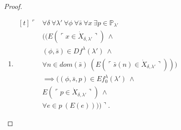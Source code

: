 \documentclass[12pt]{article}
\numberwithin{equation}{section}
\begin{document}
\begin{proof}
\begin{defi}
\begin{enumerate}[label=(S\arabic*)$_{\lambda}$, leftmargin=40pt]
    \item\label{c8}
    \!
    $\begin{aligned}[t]
        \ulcorner & \forall \delta \ \forall \lambda' \ \forall \phi \ \forall \bar{s} \ \forall x \ \exists p \in \mathbb{P}_{\lambda'} \\
        & ((E(\ulcorner x \in \dot{X}_{\delta, \lambda'} \urcorner) \ \wedge \\
        & (\phi, \bar{s}) \in Df^{\lambda}(\lambda') \ \wedge \\
        & \forall n \in dom(\bar{s}) \ (E(\ulcorner \bar{s}(n) \in \dot{X}_{\delta, \lambda'} \urcorner))) \\
        & \implies ((\phi, \bar{s}, p) \in Ef_0^{\lambda}(\lambda') \ \wedge \\
        & E(\ulcorner p \in \dot{X}_{\delta, \lambda'} \urcorner) \ \wedge \\
        & \forall e \in p \ (E(e)))) \urcorner.
    \end{aligned}$
\end{enumerate}
\end{defi}


\end{proof}
\end{document}
